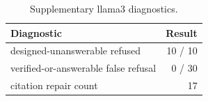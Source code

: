 \begin{table}[htbp]
\centering
\caption{Supplementary llama3 diagnostics.}
\begin{tabular}{lr}
\toprule
Diagnostic & Result \\
\midrule
designed-unanswerable refused & 10 / 10 \\
verified-or-answerable false refusal & 0 / 30 \\
citation repair count & 17 \\
\bottomrule
\end{tabular}
\end{table}
